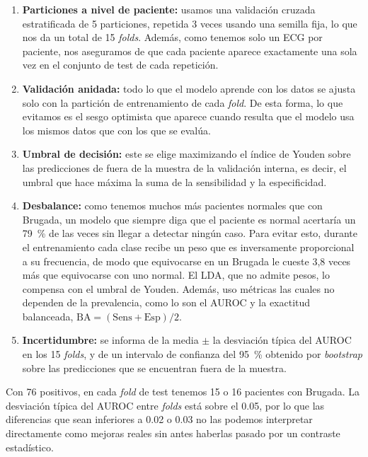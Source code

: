 \begin{enumerate}
  \item \textbf{Particiones a nivel de paciente:} usamos una validación cruzada estratificada de 5 particiones, repetida 3 veces usando una semilla fija, lo que nos da un total de 15 \emph{folds}. Además, como tenemos solo un ECG por paciente, nos aseguramos de que cada paciente aparece exactamente una sola vez en el conjunto de test de cada repetición.
  \item \textbf{Validación anidada:} todo lo que el modelo aprende con los datos se ajusta solo con la partición de entrenamiento de cada \emph{fold}. De esta forma, lo que evitamos es el sesgo optimista que aparece cuando resulta que el modelo usa los mismos datos que con los que se evalúa.
  \item \textbf{Umbral de decisión:} este se elige maximizando el índice de Youden sobre las predicciones de fuera de la muestra de la validación interna, es decir, el umbral que hace máxima la suma de la sensibilidad y la especificidad.
  \item \textbf{Desbalance:} como tenemos muchos más pacientes normales que con Brugada, un modelo que siempre diga que el paciente es normal acertaría un \SI{79}{\percent} de las veces sin llegar a detectar ningún caso. Para evitar esto, durante el entrenamiento cada clase recibe un peso que es inversamente proporcional a su frecuencia, de modo que equivocarse en un Brugada le cueste 3,8 veces más que equivocarse con uno normal. El LDA, que no admite pesos, lo compensa con el umbral de Youden. Además, uso métricas las cuales no dependen de la prevalencia, como lo son el AUROC y la exactitud balanceada, $\mathrm{BA} = (\mathrm{Sens} + \mathrm{Esp})/2$.
  \item \textbf{Incertidumbre:} se informa de la media $\pm$ la desviación típica del AUROC en los 15 \emph{folds}, y de un intervalo de confianza del \SI{95}{\percent} obtenido por \emph{bootstrap} sobre las predicciones que se encuentran fuera de la muestra.
\end{enumerate}

Con 76 positivos, en cada \emph{fold} de test tenemos 15 o 16 pacientes con Brugada. La desviación típica del AUROC entre \emph{folds} está sobre el \num{0.05}, por lo que las diferencias que sean inferiores a \num{0.02} o \num{0.03} no las podemos interpretar directamente como mejoras reales sin antes haberlas pasado por un contraste estadístico.
